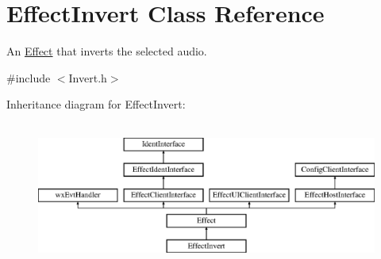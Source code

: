 \hypertarget{class_effect_invert}{}\section{Effect\+Invert Class Reference}
\label{class_effect_invert}


An \hyperlink{class_effect}{Effect} that inverts the selected audio.  




{\ttfamily \#include $<$Invert.\+h$>$}

Inheritance diagram for Effect\+Invert\+:\begin{figure}[H]
\begin{center}
\leavevmode
\includegraphics[height=4.794520cm]{class_effect_invert}
\end{center}
\end{figure}
